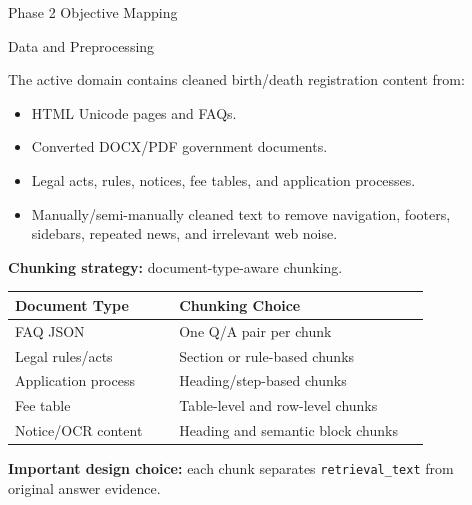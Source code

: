 \documentclass[final]{beamer}
\newlength{\sepwidth}
\newlength{\colwidth}
\newcommand{\separatorcolumn}{\begin{column}{\sepwidth}\end{column}}
\begin{document}
\begin{frame}[t]
\begin{columns}[t]
\begin{column}{\colwidth}
\begin{alertblock}{Phase 2 Objective Mapping}
  \end{alertblock}

  \begin{block}{Data and Preprocessing}

    The active domain contains cleaned birth/death registration content from:

    \begin{itemize}
      \item HTML Unicode pages and FAQs.
      \item Converted DOCX/PDF government documents.
      \item Legal acts, rules, notices, fee tables, and application processes.
      \item Manually/semi-manually cleaned text to remove navigation, footers,
        sidebars, repeated news, and irrelevant web noise.
    \end{itemize}

    \vspace{0.4em}
    \textbf{Chunking strategy:} document-type-aware chunking.

    \begin{table}
      \centering
      \small
      \begin{tabular}{p{0.34\linewidth} p{0.52\linewidth}}
        \toprule
        \textbf{Document Type} & \textbf{Chunking Choice} \\
        \midrule
        FAQ JSON & One Q/A pair per chunk \\
        Legal rules/acts & Section or rule-based chunks \\
        Application process & Heading/step-based chunks \\
        Fee table & Table-level and row-level chunks \\
        Notice/OCR content & Heading and semantic block chunks \\
        \bottomrule
      \end{tabular}
    \end{table}

    \textbf{Important design choice:} each chunk separates
    \texttt{retrieval\_text} from original answer evidence.

  \end{block}

\end{column}

\separatorcolumn



\end{columns}
\end{frame}
\end{document}
